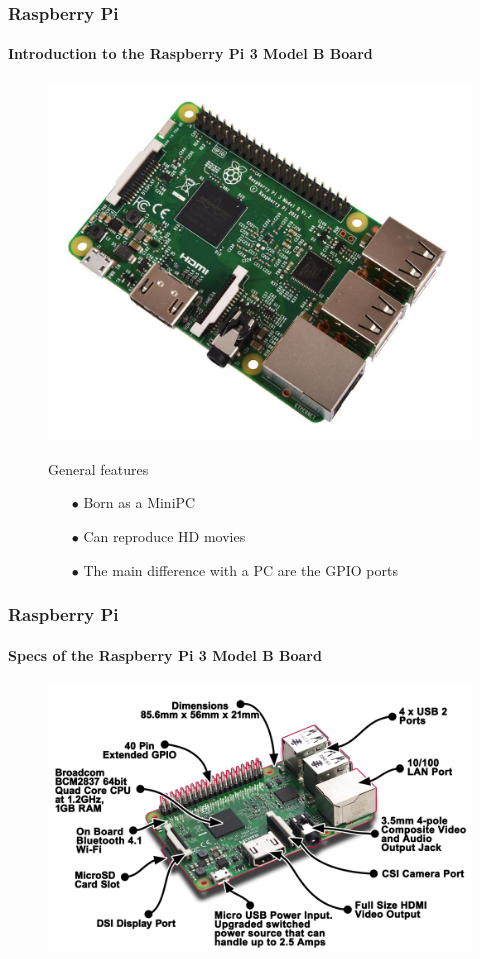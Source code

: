 \documentclass{beamer}
\begin{document}
\begin{frame}
\frametitle{\textbf{Raspberry Pi}}
\framesubtitle{\textbf{Introduction to the Raspberry Pi 3 Model B Board}}
\begin{figure}
\centering
\includegraphics[scale=0.15]{imgs/rasp3b.jpg}
\begin{block}{General features}
\begin{itemize}
\item[$\bullet$] Born as a MiniPC
\item[$\bullet$] Can reproduce HD movies
\item[$\bullet$] The main difference with a PC are the GPIO ports
\end{itemize}
\end{block}
\end{figure}
\end{frame}


\begin{frame}
\frametitle{\textbf{Raspberry Pi}}
\framesubtitle{\textbf{Specs of the Raspberry Pi 3 Model B Board}}
\begin{figure}
\centering
\includegraphics[scale=0.70]{imgs/rasp3btec.png}
\end{figure}
\end{frame}
\end{document}
